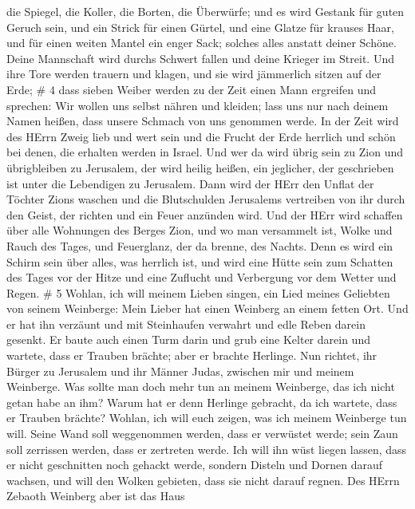 die Spiegel, die Koller, die Borten, die Überwürfe;  und es
wird Gestank für guten Geruch sein, und ein Strick für einen Gürtel, und
eine Glatze für krauses Haar, und für einen weiten Mantel ein enger
Sack; solches alles anstatt deiner Schöne.  Deine
Mannschaft wird durchs Schwert fallen und deine Krieger im Streit.
 Und ihre Tore werden trauern und klagen, und sie wird
jämmerlich sitzen auf der Erde; \# 4  dass sieben Weiber
werden zu der Zeit einen Mann ergreifen und sprechen: Wir wollen uns
selbst nähren und kleiden; lass uns nur nach deinem Namen heißen, dass
unsere Schmach von uns genommen werde.  In der Zeit wird des
HErrn Zweig lieb und wert sein und die Frucht der Erde herrlich und
schön bei denen, die erhalten werden in Israel.  Und wer da
wird übrig sein zu Zion und übrigbleiben zu Jerusalem, der wird heilig
heißen, ein jeglicher, der geschrieben ist unter die Lebendigen zu
Jerusalem.  Dann wird der HErr den Unflat der Töchter Zions
waschen und die Blutschulden Jerusalems vertreiben von ihr durch den
Geist, der richten und ein Feuer anzünden wird.  Und der
HErr wird schaffen über alle Wohnungen des Berges Zion, und wo man
versammelt ist, Wolke und Rauch des Tages, und Feuerglanz, der da
brenne, des Nachts. Denn es wird ein Schirm sein über alles, was
herrlich ist,  und wird eine Hütte sein zum Schatten des
Tages vor der Hitze und eine Zuflucht und Verbergung vor dem Wetter und
Regen. \# 5  Wohlan, ich will meinem Lieben singen, ein Lied
meines Geliebten von seinem Weinberge: Mein Lieber hat einen Weinberg an
einem fetten Ort.  Und er hat ihn verzäunt und mit
Steinhaufen verwahrt und edle Reben darein gesenkt. Er baute auch einen
Turm darin und grub eine Kelter darein und wartete, dass er Trauben
brächte; aber er brachte Herlinge.  Nun richtet, ihr Bürger
zu Jerusalem und ihr Männer Judas, zwischen mir und meinem Weinberge.
 Was sollte man doch mehr tun an meinem Weinberge, das ich
nicht getan habe an ihm? Warum hat er denn Herlinge gebracht, da ich
wartete, dass er Trauben brächte?  Wohlan, ich will euch
zeigen, was ich meinem Weinberge tun will. Seine Wand soll weggenommen
werden, dass er verwüstet werde; sein Zaun soll zerrissen werden, dass
er zertreten werde.  Ich will ihn wüst liegen lassen, dass
er nicht geschnitten noch gehackt werde, sondern Disteln und Dornen
darauf wachsen, und will den Wolken gebieten, dass sie nicht darauf
regnen.  Des HErrn Zebaoth Weinberg aber ist das Haus
